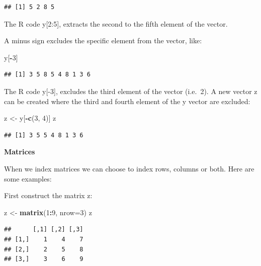 \documentclass[]{book}
\newenvironment{Shaded}{\begin{snugshade}}{\end{snugshade}}
\newcommand{\KeywordTok}[1]{\textcolor[rgb]{0.13,0.29,0.53}{\textbf{#1}}}
\newcommand{\DataTypeTok}[1]{\textcolor[rgb]{0.13,0.29,0.53}{#1}}
\newcommand{\DecValTok}[1]{\textcolor[rgb]{0.00,0.00,0.81}{#1}}
\newcommand{\StringTok}[1]{\textcolor[rgb]{0.31,0.60,0.02}{#1}}
\newcommand{\OperatorTok}[1]{\textcolor[rgb]{0.81,0.36,0.00}{\textbf{#1}}}
\newcommand{\NormalTok}[1]{#1}
\begin{document}
\begin{verbatim}
## [1] 5 2 8 5
\end{verbatim}

The R code y{[}2:5{]}, extracts the second to the fifth element of the
vector.

A minus sign excludes the specific element from the vector, like:

\begin{Shaded}
\begin{Highlighting}[]
\NormalTok{y[}\OperatorTok{-}\DecValTok{3}\NormalTok{]}
\end{Highlighting}
\end{Shaded}

\begin{verbatim}
## [1] 3 5 8 5 4 8 1 3 6
\end{verbatim}

The R code y{[}-3{]}, excludes the third element of the vector (i.e.~2).
A new vector z can be created where the third and fourth element of the
y vector are excluded:

\begin{Shaded}
\begin{Highlighting}[]
\NormalTok{z <-}\StringTok{ }\NormalTok{y[}\OperatorTok{-}\KeywordTok{c}\NormalTok{(}\DecValTok{3}\NormalTok{, }\DecValTok{4}\NormalTok{)]}
\NormalTok{z}
\end{Highlighting}
\end{Shaded}

\begin{verbatim}
## [1] 3 5 5 4 8 1 3 6
\end{verbatim}

\textbf{Matrices}

When we index matrices we can choose to index rows, columns or both.
Here are some examples:

First construct the matrix z:

\begin{Shaded}
\begin{Highlighting}[]
\NormalTok{z <-}\StringTok{ }\KeywordTok{matrix}\NormalTok{(}\DecValTok{1}\OperatorTok{:}\DecValTok{9}\NormalTok{, }\DataTypeTok{nrow=}\DecValTok{3}\NormalTok{)}
\NormalTok{z}
\end{Highlighting}
\end{Shaded}

\begin{verbatim}
##      [,1] [,2] [,3]
## [1,]    1    4    7
## [2,]    2    5    8
## [3,]    3    6    9
\end{verbatim}
\end{document}
